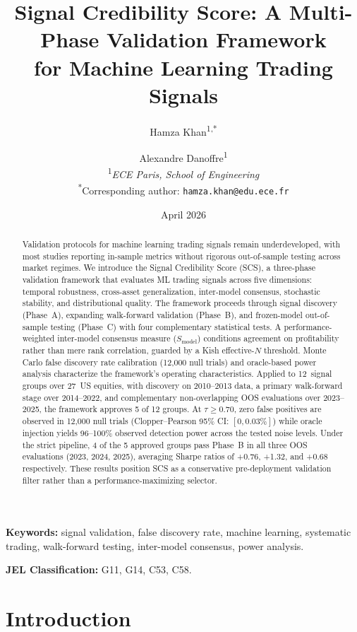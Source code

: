 \documentclass[12pt,a4paper]{article}
\title{%
  Signal Credibility Score: A Multi-Phase Validation Framework\\
  for Machine Learning Trading Signals%
}
\author{%
  Hamza Khan\textsuperscript{1,*} \and Alexandre Danoffre\textsuperscript{1}\\[4pt]
  \textsuperscript{1}\textit{ECE Paris, School of Engineering}\\[2pt]
  \textsuperscript{*}Corresponding author: \texttt{hamza.khan@edu.ece.fr}%
}
\date{April 2026}
\begin{document}
\maketitle

\begin{abstract}
Validation protocols for machine learning trading signals remain underdeveloped, with most studies reporting in-sample metrics without rigorous out-of-sample testing across market regimes. We introduce the Signal Credibility Score (SCS), a three-phase validation framework that evaluates ML trading signals across five dimensions: temporal robustness, cross-asset generalization, inter-model consensus, stochastic stability, and distributional quality. The framework proceeds through signal discovery (Phase~A), expanding walk-forward validation (Phase~B), and frozen-model out-of-sample testing (Phase~C) with four complementary statistical tests. A performance-weighted inter-model consensus measure ($S_{\text{model}}$) conditions agreement on profitability rather than mere rank correlation, guarded by a Kish effective-$N$ threshold. Monte Carlo false discovery rate calibration (12{,}000 null trials) and oracle-based power analysis characterize the framework's operating characteristics. Applied to 12~signal groups over 27~US equities, with discovery on 2010--2013 data, a primary walk-forward stage over 2014--2022, and complementary non-overlapping OOS evaluations over 2023--2025, the framework approves 5 of 12 groups. At $\tau\geq0.70$, zero false positives are observed in 12{,}000 null trials (Clopper--Pearson 95\% CI: $[0, 0.03\%]$) while oracle injection yields 96--100\% observed detection power across the tested noise levels. Under the strict pipeline, 4 of the 5 approved groups pass Phase~B in all three OOS evaluations (2023, 2024, 2025), averaging Sharpe ratios of +0.76, +1.32, and +0.68 respectively. These results position SCS as a conservative pre-deployment validation filter rather than a performance-maximizing selector.
\end{abstract}

\medskip\noindent
\textbf{Keywords:} signal validation, false discovery rate, machine learning, systematic trading, walk-forward testing, inter-model consensus, power analysis.

\medskip\noindent
\textbf{JEL Classification:} G11, G14, C53, C58.


\section{Introduction}
\label{sec:intro}
\end{document}
